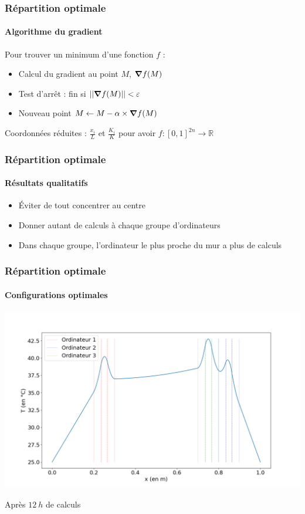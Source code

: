 \documentclass[a4paper,11pt]{beamer}
\begin{document}
\begin{frame}
    \frametitle{Répartition optimale}
    \framesubtitle{Algorithme du gradient}

    Pour trouver un minimum d'une fonction $f$ :
    \begin{itemize}
        \item Calcul du gradient au point $M$, $\grad f (M)$
        \item Test d'arrêt : fin si $||\grad f (M)|| < \varepsilon$
        \item Nouveau point $M \leftarrow M - \alpha \times \grad f (M)$
    \end{itemize}

    Coordonnées réduites : $\frac{x_i}{L}$ et $\frac{K_i}{K}$ pour avoir $f : [0, 1]^{2n} \rightarrow \mathbb{R}$
\end{frame}

\begin{frame}
    \frametitle{Répartition optimale}
    \framesubtitle{Résultats qualitatifs}

    \begin{itemize}
        \item Éviter de tout concentrer au centre
        \item Donner autant de calculs à chaque groupe d'ordinateurs
        \item Dans chaque groupe, l'ordinateur le plus proche du mur a plus de calculs
    \end{itemize}
\end{frame}

\begin{frame}
    \frametitle{Répartition optimale}
    \framesubtitle{Configurations optimales}

    \includegraphics[width=\textwidth]{min_position.png}

    \begin{center}
        Après $\SI{12}{h}$ de calculs
    \end{center}
\end{frame}
\end{document}
